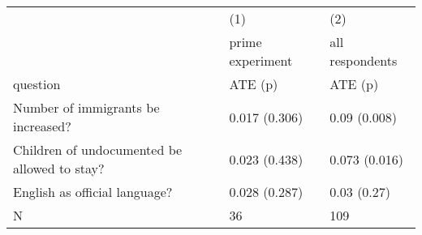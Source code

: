 \begin{tabular}{lll}
  \hline
  \hline
 & (1) & (2) \\ 
   & prime experiment & all respondents \\ 
  question & ATE (p) & ATE (p) \\ 
  Number of immigrants be increased? & 0.017 (0.306) & 0.09 (0.008) \\ 
  Children of undocumented be allowed to stay? & 0.023 (0.438) & 0.073 (0.016) \\ 
  English as official language? & 0.028 (0.287) & 0.03 (0.27) \\ 
  N & 36 & 109 \\ 
   \hline
\end{tabular}
